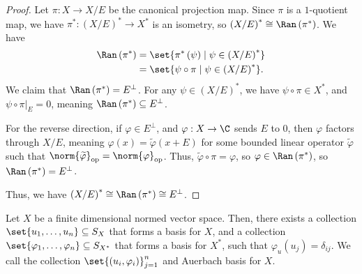 \documentclass[10pt]{mypackage}
\begin{document}
\begin{proof}
  Let $\pi: X\rightarrow X/E$ be the canonical projection map. Since $\pi$ is a $1$-quotient map, we have $\pi^{\ast}:\left(X/E\right)^{\ast}\rightarrow X^{\ast}$ is an isometry, so $\left(X/E\right)^{\ast} \cong \Ran\left(\pi^{\ast}\right)$. We have
  \begin{align*}
    \Ran\left(\pi^{\ast}\right) &= \set{\pi^{\ast}\left(\psi\right)\mid \psi\in \left(X/E\right)^{\ast}}\\
                                &= \set{\psi\circ \pi\mid \psi\in \left(X/E\right)^{\ast}}.
  \end{align*}
  We claim that $\Ran\left(\pi^{\ast}\right) = E^{\perp}$. For any $\psi\in \left(X/E\right)^{\ast}$, we have $\psi\circ \pi\in X^{\ast}$, and $\psi\circ \pi|_{E} = 0$, meaning $\Ran\left(\pi^{\ast}\right) \subseteq E^{\perp}$.\newline

  For the reverse direction, if $\varphi\in E^{\perp}$, and $\varphi: X\rightarrow \C$ sends $E$ to $0$, then $\varphi$ factors through $X/E$, meaning $\varphi(x) = \widetilde{\varphi}\left(x+E\right)$ for some bounded linear operator $\widetilde{\varphi}$ such that $\norm{\widetilde{\varphi}}_{\text{op}} = \norm{\varphi}_{\text{op}}$. Thus, $\widetilde{\varphi}\circ \pi = \varphi$, so $\varphi\in \Ran\left(\pi^{\ast}\right)$, so $\Ran\left(\pi^{\ast}\right) = E^{\perp}$.\newline

  Thus, we have $\left(X/E\right)^{\ast} \cong \Ran\left(\pi^{\ast}\right) \cong E^{\perp}$.
\end{proof}
\begin{proposition}
  Let $X$ be a finite dimensional normed vector space. Then, there exists a collection $\set{u_1,\dots,u_n}\subseteq S_X$ that forms a basis for $X$, and a collection $\set{\varphi_1,\dots,\varphi_n}\subseteq S_{X^{\ast}}$ that forms a basis for $X^{\ast}$, such that $\varphi_u\left(u_j\right) = \delta_{ij}$. We call the collection $\set{\left(u_i,\varphi_i\right)}_{j=1}^{n}$ and Auerbach basis for $X$.
\end{proposition}
\end{document}
